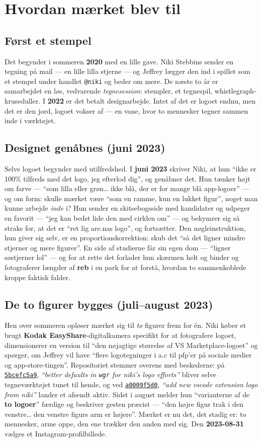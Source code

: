 \documentclass[10pt,letterpaper,twocolumn]{article}
\newcommand{\commit}[2]{\href{https://github.com/whistlegraph/aesthetic-computer/commit/#1}{\texttt{#1}}, \emph{``#2''}}
\begin{document}
\section{Hvordan mærket blev til}

\subsection{Først et stempel}
Det begynder i sommeren \textbf{2020} med en lille gave. Niki Stebbins
sender en tegning på mail --- en lille lilla stjerne --- og Jeffrey lægger
den ind i spillet som et stempel under handlet \texttt{@niki} og beder om
mere. De næste to år er samarbejdet en løs, vedvarende \emph{tegnesession}:
stempler, et tegnespil, whistlegraph-kruseduller. I \textbf{2022} er det
betalt designarbejde. Intet af det er logoet endnu, men det er den jord,
logoet vokser af --- en vane, hvor to mennesker tegner sammen inde i
værktøjet.

\subsection{Designet genåbnes (juni 2023)}
Selve logoet begynder med utilfredshed. I \textbf{juni 2023} skriver Niki,
at hun ``ikke er 100\% tilfreds med det logo, jeg efterlod dig'', og genåbner
det. Hun tænker højt om farve --- ``som lilla eller grøn\dots{} ikke blå, der
er for mange blå app-logoer'' --- og om form: skulle mærket være ``som en
ramme, kun en lukket figur'', noget man kunne arbejde \emph{inde} i? Hun
sender en skitsebogsside med kandidater og udpeger en favorit --- ``jeg
kan bedst lide den med cirklen om'' --- og bekymrer sig så straks for, at
det er ``ret lig are.nas logo'', og fortsætter. Den nøgleinstruktion, hun
giver sig selv, er en proportionskorrektion: skub det ``så det ligner mindre
stjerner og mere figurer''. En side af studierne får sin egen dom ---
``ligner søstjerner lol'' --- og for at rette det forlader hun skærmen helt
og binder og fotograferer længder af \textbf{reb} i en park for at forstå,
hvordan to sammenkoblede kroppe faktisk falder.

\subsection{De to figurer bygges (juli--august 2023)}
Hen over sommeren opløser mærket sig til \emph{to} figurer frem for én.
Niki køber et brugt \textbf{Kodak EasyShare}-digitalkamera specifikt for at
fotografere logoet, dimensionerer en version til ``den nøjagtige størrelse
af VS Marketplace-logoet'' og spørger, om Jeffrey vil have ``flere
logotegninger i a.c til pfp'er på sociale medier og app-store-tingen''.
Repositoriet stemmer overens med beskederne: på
\commit{5bcefc5a9}{better defaults in \texttt{wgr} for niki's logo efforts}
bliver selve tegneværktøjet tunet til hende, og ved
\commit{a0009f5d0}{add new vscode extension logo from niki} lander et
afsendt aktiv. Sidst i august melder hun ``varianterne af de \textbf{to
logoer}'' færdige og beskriver gesten præcist --- ``den højre figur trak i
den venstre\dots{} den venstre figurs arm er højere''. Mærket er nu det,
det stadig er: to mennesker, arme oppe, den ene trækker den anden med sig.
Den \textbf{2023-08-31} vælges et Instagram-profilbillede.
\end{document}
